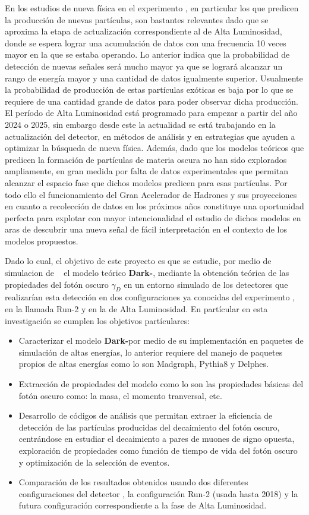 En los estudios de nueva física en el experimento \LHC, en particular los que predicen la producción de nuevas partículas, son bastantes relevantes dado que se aproxima la etapa de actualización correspondiente al de Alta Luminosidad, donde se espera lograr una acumulación de datos con una frecuencia 10 veces mayor en la que se estaba operando. Lo anterior indica que la probabilidad de detección de nuevas señales será mucho mayor ya que se logrará alcanzar un rango de energía mayor y una cantidad de datos igualmente superior. Usualmente la probabilidad de producción de estas partículas exóticas es baja por lo que se requiere de una cantidad grande de datos para poder observar dicha producción. El período de Alta Luminosidad está programado para empezar a partir del año 2024 o 2025, sin embargo desde este la actualidad se está trabajando en la actualización del detector, en métodos de análisis y en estrategias que ayuden a optimizar la búsqueda de nueva física. Además, dado que los modelos teóricos que predicen la formación de partículas de materia oscura no han sido explorados ampliamente, en gran medida por falta de datos experimentales que permitan alcanzar el espacio fase que dichos modelos predicen para esas partículas. Por todo ello el funcionamiento del Gran Acelerador de Hadrones y sus proyecciones en cuanto a recolección de datos en los próximos años constituye una oportunidad perfecta para explotar con mayor intencionalidad el estudio de dichos modelos en aras de descubrir una nueva señal de fácil interpretación en el contexto de los modelos propuestos. 

Dado lo cual, el objetivo de este proyecto es que se estudie, por medio de simulacion de \MC ~ el modelo teórico \textbf{Dark-}\SUSY, mediante la obtención teórica de las propiedades del fotón oscuro $\gamma_D$ en un entorno  simulado de los detectores que realizarían esta detección en dos  configuraciones ya conocidas del experimento \CMS, en la llamada Run-2 y en la  de Alta Luminosidad. En partícular en esta investigación se cumplen los objetivos partículares:
\begin{itemize}
\item Caracterizar el modelo \textbf{Dark-}\SUSY por medio de su implementación en paquetes de simulación de altas energías, lo anterior requiere del manejo de paquetes propios de altas energías como lo son Madgraph, Pythia8 y Delphes.
\item Extracción de propiedades del modelo como lo son las propiedades básicas del fotón oscuro como: la masa, el momento tranversal, etc.
\item Desarrollo de códigos de análisis que permitan extraer la eficiencia de detección de las partículas producidas del decaimiento del fotón oscuro, centrándose en estudiar el decaimiento a pares de muones de signo opuesta, exploración de propiedades como función de tiempo de vida del fotón oscuro y optimización de la selección de eventos.
\item Comparación de los resultados obtenidos usando dos diferentes configuraciones del detector \CMS, la configuración Run-2 (usada hasta 2018) y la futura configuración correspondiente a la fase de Alta Luminosidad.
\end{itemize}


